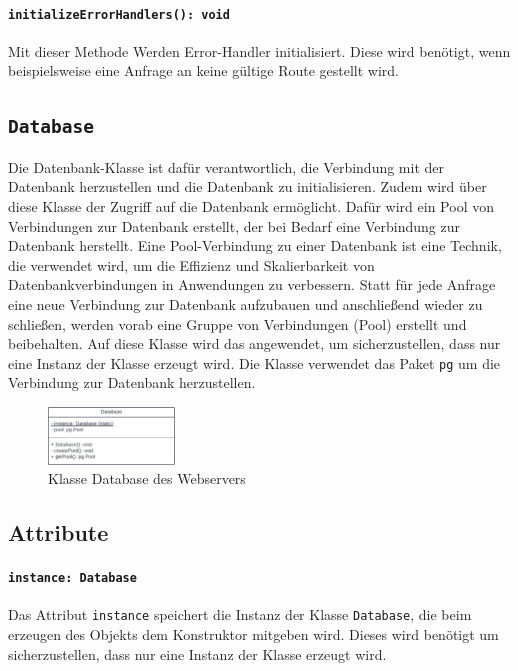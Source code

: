 \documentclass{entwurfsheft}
\begin{document}
\paragraph{\texttt{initializeErrorHandlers(): void}}
Mit dieser Methode Werden Error-Handler initialisiert. Diese wird benötigt, wenn beispielsweise eine Anfrage an keine gültige Route gestellt wird.

\newpage

\subsection{\texttt{Database}}\label{sec:Database}
Die Datenbank-Klasse ist dafür verantwortlich, die Verbindung mit der Datenbank herzustellen und die Datenbank zu initialisieren.
Zudem wird über diese Klasse der Zugriff auf die Datenbank ermöglicht.
Dafür wird ein Pool von Verbindungen zur Datenbank erstellt, der bei Bedarf eine Verbindung zur Datenbank herstellt.
Eine Pool-Verbindung zu einer Datenbank ist eine Technik, die verwendet wird, um die Effizienz und Skalierbarkeit von Datenbankverbindungen in Anwendungen zu verbessern.
Statt für jede Anfrage eine neue Verbindung zur Datenbank aufzubauen und anschließend wieder zu schließen, werden vorab eine Gruppe von Verbindungen (Pool) erstellt und beibehalten.
Auf diese Klasse wird das  angewendet, um sicherzustellen, dass nur eine Instanz der Klasse erzeugt wird.
Die Klasse verwendet das Paket \texttt{pg} um die Verbindung zur Datenbank herzustellen.

\begin{figure}[htp]
    \centering
    \includegraphics[width = 0.3\textwidth]{images/webserver/database.pdf}
    \caption{Klasse Database des Webservers}
    \label{fig:database}
\end{figure}

\subsection*{Attribute}
\paragraph{\texttt{instance: Database}}
Das Attribut \texttt{instance} speichert die Instanz der Klasse \texttt{Database}, die beim erzeugen des Objekts dem Konstruktor mitgeben wird.
Dieses wird benötigt um sicherzustellen, dass nur eine Instanz der Klasse erzeugt wird.
\end{document}
